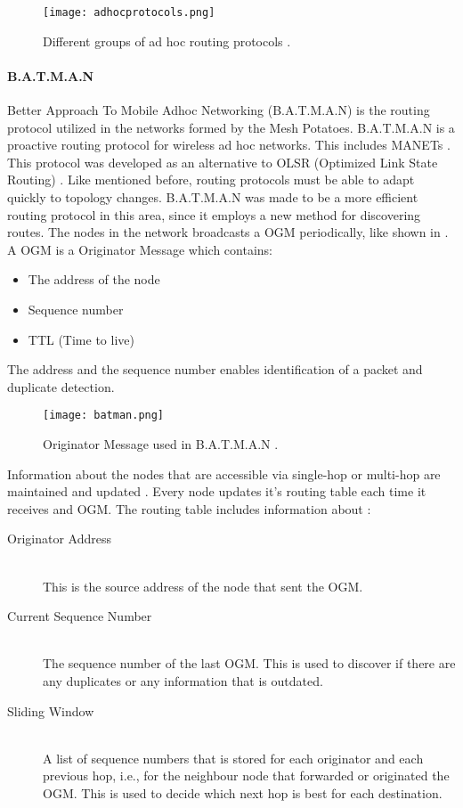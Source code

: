 \begin{figure}[h!]
  \centering
    \texttt{[image: adhocprotocols.png]}
     \caption{Different groups of ad hoc routing protocols \cite{adhoc}.}
\label{fig:adhocprotocols}
\end{figure}


\paragraph{B.A.T.M.A.N}
Better Approach To Mobile Adhoc Networking (B.A.T.M.A.N) is the routing protocol utilized in the networks formed by the Mesh Potatoes. B.A.T.M.A.N is a proactive routing protocol for wireless ad hoc networks. This includes MANETs \cite{batman}. This protocol was developed as an alternative to OLSR (Optimized Link State Routing) \cite{batman2}. Like mentioned before, routing protocols must be able to adapt quickly to topology changes. B.A.T.M.A.N was made to be a more efficient routing protocol in this area, since it employs a new method for discovering routes. The nodes in the network broadcasts a OGM periodically, like shown in . A OGM is a Originator Message which contains: 

\begin{itemize}
\item The address of the node
\item Sequence number
\item TTL (Time to live)
\end{itemize}

The address and the sequence number enables identification of a packet and duplicate detection. 

\begin{figure}[h!]
  \centering
    \texttt{[image: batman.png]}
     \caption{Originator Message used in B.A.T.M.A.N \cite{batman2}.}
\label{fig:batman} 
\end{figure}


Information about the nodes that are accessible via single-hop or multi-hop are maintained and updated \cite{batman}. Every node updates it's routing table each time it receives and OGM. The routing table includes information about \cite{batman2}:

\begin{description}
  \item[Originator Address] \hfill \\
  This is the source address of the node that sent the OGM.
  \item[Current Sequence Number] \hfill \\
  The sequence number of the last OGM. This is used to discover if there are any duplicates or any information that is outdated.
  \item[Sliding Window] \hfill \\
  A list of sequence numbers that is stored for each originator and each previous hop, i.e., for the neighbour node that forwarded or originated the OGM. This is used to decide which next hop is best for each destination. 
\end{description}

